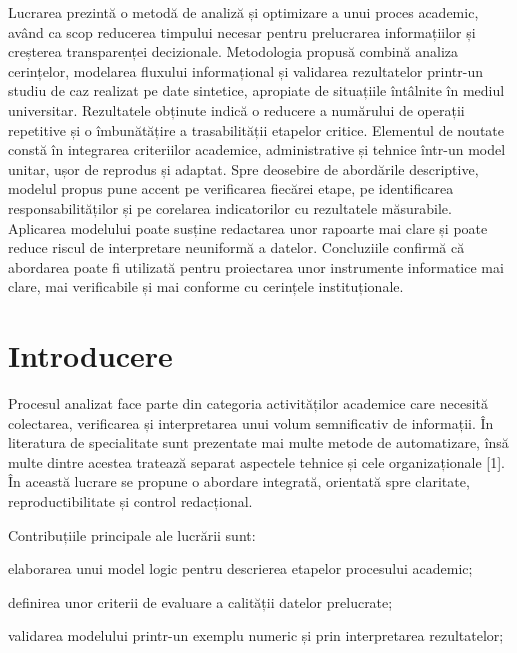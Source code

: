 \documentclass{utmconf}
\begin{document}
\makeutmtitle

\begin{rezumat}
Lucrarea prezintă o metodă de analiză și optimizare a unui proces academic, având ca scop reducerea timpului necesar pentru prelucrarea informațiilor și creșterea transparenței decizionale. Metodologia propusă combină analiza cerințelor, modelarea fluxului informațional și validarea rezultatelor printr-un studiu de caz realizat pe date sintetice, apropiate de situațiile întâlnite în mediul universitar. Rezultatele obținute indică o reducere a numărului de operații repetitive și o îmbunătățire a trasabilității etapelor critice. Elementul de noutate constă în integrarea criteriilor academice, administrative și tehnice într-un model unitar, ușor de reprodus și adaptat. Spre deosebire de abordările descriptive, modelul propus pune accent pe verificarea fiecărei etape, pe identificarea responsabilităților și pe corelarea indicatorilor cu rezultatele măsurabile. Aplicarea modelului poate susține redactarea unor rapoarte mai clare și poate reduce riscul de interpretare neuniformă a datelor. Concluziile confirmă că abordarea poate fi utilizată pentru proiectarea unor instrumente informatice mai clare, mai verificabile și mai conforme cu cerințele instituționale.
\end{rezumat}


\section*{Introducere}

Procesul analizat face parte din categoria activităților academice care necesită colectarea, verificarea și interpretarea unui volum semnificativ de informații. În literatura de specialitate sunt prezentate mai multe metode de automatizare, însă multe dintre acestea tratează separat aspectele tehnice și cele organizaționale [1]. În această lucrare se propune o abordare integrată, orientată spre claritate, reproductibilitate și control redacțional.

Contribuțiile principale ale lucrării sunt:
\begin{utmenumerate}
\item elaborarea unui model logic pentru descrierea etapelor procesului academic;
\item definirea unor criterii de evaluare a calității datelor prelucrate;
\item validarea modelului printr-un exemplu numeric și prin interpretarea rezultatelor;
\end{utmenumerate}
\end{document}
